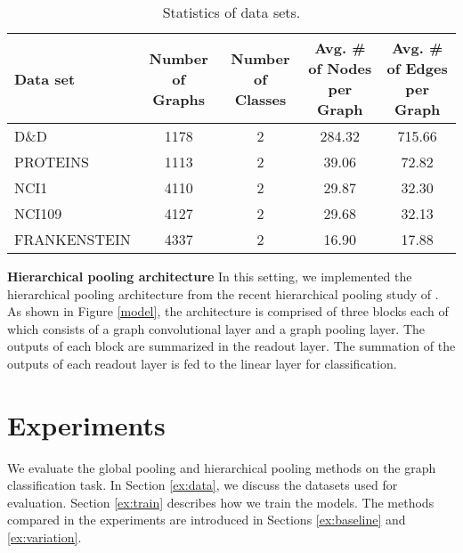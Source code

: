 \documentclass{article}
\begin{document}
\begin{table*}[t!]
\caption{Statistics of data sets.}
\label{tab:statistics}
\vskip 0.15in
\begin{center}
\begin{small}
\begin{tabular}{lcccc}
\toprule
\textbf{Data set} & \textbf{Number of Graphs} & \textbf{Number of Classes} & \textbf{Avg. \# of Nodes per Graph} & \textbf{Avg. \# of Edges per Graph}\\
\midrule
D\&D    & 1178 & 2 & 284.32 & 715.66 \\
PROTEINS    & 1113 & 2 & 39.06 & 72.82 \\
NCI1    & 4110 & 2 & 29.87 & 32.30 \\
NCI109    & 4127 & 2 & 29.68 & 32.13 \\
FRANKENSTEIN    & 4337 & 2 & 16.90 & 17.88 \\
\bottomrule
\end{tabular}
\end{small}
\end{center}
\vskip -0.1in
\end{table*}


\textbf{Hierarchical pooling architecture}
In this setting, we implemented the hierarchical pooling architecture from the recent hierarchical pooling study of \citeauthor{cangea2018towards}. As shown in Figure \ref{model}, the architecture is comprised of three blocks each of which consists of a graph convolutional layer and a graph pooling layer. The outputs of each block are summarized in the readout layer. The summation of the outputs of each readout layer is fed to the linear layer for classification. 
\section{Experiments}
\label{experiments}
We evaluate the global pooling and hierarchical pooling methods on the graph classification task. In Section \ref{ex:data}, we discuss the datasets used for evaluation. Section \ref{ex:train} describes how we train the models. The methods compared in the experiments are introduced in Sections \ref{ex:baseline} and \ref{ex:variation}.
\end{document}
